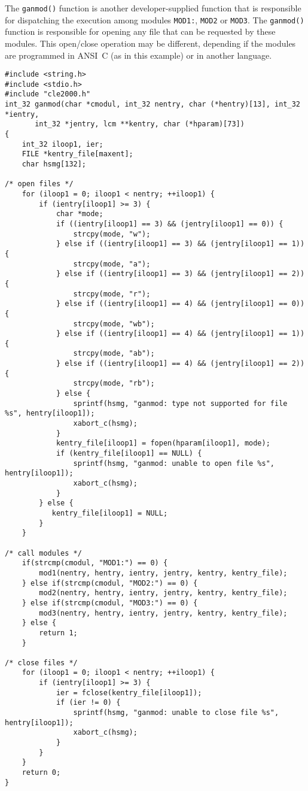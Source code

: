 The {\tt ganmod()} function is another developer-supplied function that is responsible for dispatching the execution among modules
{\tt MOD1:}, {\tt MOD2} or {\tt MOD3}. The {\tt ganmod()} function is responsible for opening any file that can be requested
by these modules. This open/close operation may be different, depending if the modules are programmed in ANSI~C (as in this example) or in another language.
\begin{verbatim}
#include <string.h>
#include <stdio.h>
#include "cle2000.h"
int_32 ganmod(char *cmodul, int_32 nentry, char (*hentry)[13], int_32 *ientry,
       int_32 *jentry, lcm **kentry, char (*hparam)[73])
{
    int_32 iloop1, ier;
    FILE *kentry_file[maxent];
    char hsmg[132];

/* open files */
    for (iloop1 = 0; iloop1 < nentry; ++iloop1) {
        if (ientry[iloop1] >= 3) {
            char *mode;
            if ((ientry[iloop1] == 3) && (jentry[iloop1] == 0)) {
                strcpy(mode, "w");
            } else if ((ientry[iloop1] == 3) && (jentry[iloop1] == 1)) {
                strcpy(mode, "a");
            } else if ((ientry[iloop1] == 3) && (jentry[iloop1] == 2)) {
                strcpy(mode, "r");
            } else if ((ientry[iloop1] == 4) && (jentry[iloop1] == 0)) {
                strcpy(mode, "wb");
            } else if ((ientry[iloop1] == 4) && (jentry[iloop1] == 1)) {
                strcpy(mode, "ab");
            } else if ((ientry[iloop1] == 4) && (jentry[iloop1] == 2)) {
                strcpy(mode, "rb");
            } else {
                sprintf(hsmg, "ganmod: type not supported for file %s", hentry[iloop1]);
                xabort_c(hsmg);
            }
            kentry_file[iloop1] = fopen(hparam[iloop1], mode);
            if (kentry_file[iloop1] == NULL) {
                sprintf(hsmg, "ganmod: unable to open file %s", hentry[iloop1]);
                xabort_c(hsmg);
            }
        } else {
           kentry_file[iloop1] = NULL;
        }
    }
 
/* call modules */
    if(strcmp(cmodul, "MOD1:") == 0) {
        mod1(nentry, hentry, ientry, jentry, kentry, kentry_file);
    } else if(strcmp(cmodul, "MOD2:") == 0) {
        mod2(nentry, hentry, ientry, jentry, kentry, kentry_file);
    } else if(strcmp(cmodul, "MOD3:") == 0) {
        mod3(nentry, hentry, ientry, jentry, kentry, kentry_file);
    } else {
        return 1;
    }

/* close files */
    for (iloop1 = 0; iloop1 < nentry; ++iloop1) {
        if (ientry[iloop1] >= 3) {
            ier = fclose(kentry_file[iloop1]);
            if (ier != 0) {
                sprintf(hsmg, "ganmod: unable to close file %s", hentry[iloop1]);
                xabort_c(hsmg);
            }
        }
    }
    return 0;
}
\end{verbatim}

